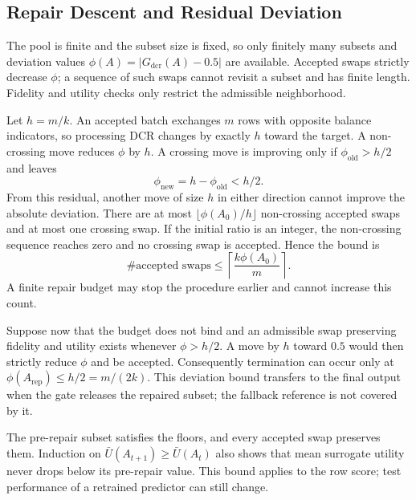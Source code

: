 \documentclass[conference]{IEEEtran}
\begin{document}
\subsection{Repair Descent and Residual Deviation}
\begin{IEEEproof}
The pool is finite and the subset size is fixed, so only finitely many subsets and deviation values $\phi(A)=|G_{\mathrm{dcr}}(A)-0.5|$ are available. Accepted swaps strictly decrease $\phi$; a sequence of such swaps cannot revisit a subset and has finite length. Fidelity and utility checks only restrict the admissible neighborhood.

Let $h=m/k$. An accepted batch exchanges $m$ rows with opposite balance indicators, so processing DCR changes by exactly $h$ toward the target. A non-crossing move reduces $\phi$ by $h$. A crossing move is improving only if $\phi_{\mathrm{old}}>h/2$ and leaves
\[
\phi_{\mathrm{new}}=h-\phi_{\mathrm{old}}<h/2.
\]
From this residual, another move of size $h$ in either direction cannot improve the absolute deviation. There are at most $\lfloor\phi(A_0)/h\rfloor$ non-crossing accepted swaps and at most one crossing swap. If the initial ratio is an integer, the non-crossing sequence reaches zero and no crossing swap is accepted. Hence the bound is
\[
\#\text{accepted swaps}\le\left\lceil\frac{k\phi(A_0)}m\right\rceil.
\]
A finite repair budget may stop the procedure earlier and cannot increase this count.

Suppose now that the budget does not bind and an admissible swap preserving fidelity and utility exists whenever $\phi>h/2$. A move by $h$ toward $0.5$ would then strictly reduce $\phi$ and be accepted. Consequently termination can occur only at $\phi(A_{\mathrm{rep}})\le h/2=m/(2k)$. This deviation bound transfers to the final output when the gate releases the repaired subset; the fallback reference is not covered by it.

The pre-repair subset satisfies the floors, and every accepted swap preserves them. Induction on $\bar U(A_{t+1})\ge\bar U(A_t)$ also shows that mean surrogate utility never drops below its pre-repair value. This bound applies to the row score; test performance of a retrained predictor can still change.
\end{IEEEproof}
\end{document}
